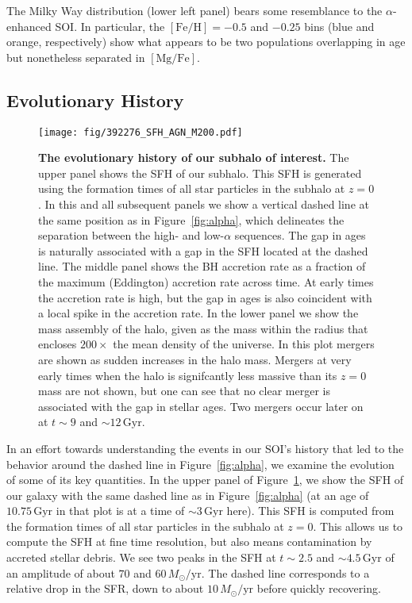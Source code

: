 \documentclass[linenumbers, twocolumn]{aastex631}
\newcommand{\Msun}{\ensuremath{M_{\odot}}}
\newcommand{\Gyr}{\ensuremath{\textrm{Gyr}}}
\newcommand{\FeH}{\ensuremath{[\textrm{Fe}/\textrm{H}]}}
\newcommand{\MgFe}{\ensuremath{[\textrm{Mg}/\textrm{Fe}]}}
\newcommand{\Msunyr}{\ensuremath{\Msun/\textrm{yr}}}
\begin{document}
The Milky Way distribution (lower left panel) bears some resemblance to the $\alpha$-enhanced SOI. In particular, the $\FeH=-0.5$ and $-0.25$ bins (blue and orange, respectively) show what appears to be two populations overlapping in age but nonetheless separated in \MgFe{}.

\subsection{Evolutionary History}\label{ssec:evol}

\begin{figure}
  \centering
  \texttt{[image: fig/392276\_SFH\_AGN\_M200.pdf]}
  \caption{\textbf{The evolutionary history of our subhalo of interest.} The upper panel shows the SFH of our subhalo. This SFH is generated using the formation times of all star particles in the subhalo at $z=0$. In this and all subsequent panels we show a vertical dashed line at the same position as in Figure~\ref{fig:alpha}, which delineates the separation between the high- and low-$\alpha$ sequences. The gap in ages is naturally associated with a gap in the SFH located at the dashed line. The middle panel shows the BH accretion rate as a fraction of the maximum (Eddington) accretion rate across time. At early times the accretion rate is high, but the gap in ages is also coincident with a local spike in the accretion rate. In the lower panel we show the mass assembly of the halo, given as the mass within the radius that encloses $200\times$ the mean density of the universe. In this plot mergers are shown as sudden increases in the halo mass. Mergers at very early times when the halo is signifcantly less massive than its $z=0$ mass are not shown, but one can see that no clear merger is associated with the gap in stellar ages. Two mergers occur later on at $t\sim9$ and $\sim12\,\Gyr$.}
  \label{fig:history}
\end{figure}

In an effort towards understanding the events in our SOI's history that led to the behavior around the dashed line in Figure~\ref{fig:alpha}, we examine the evolution of some of its key quantities. In the upper panel of Figure~\ref{fig:history}, we show the SFH of our galaxy with the same dashed line as in Figure~\ref{fig:alpha} (at an age of $10.75\,\Gyr$ in that plot is at a time of $\sim3\,\Gyr$ here). This SFH is computed from the formation times of all star particles in the subhalo at $z=0$. This allows us to compute the SFH at fine time resolution, but also means contamination by accreted stellar debris. We see two peaks in the SFH at $t\sim2.5$ and $\sim4.5\,\Gyr$ of an amplitude of about $70$ and $60\,\Msunyr$. The dashed line corresponds to a relative drop in the SFR, down to about $10\,\Msunyr$ before quickly recovering.
\end{document}
